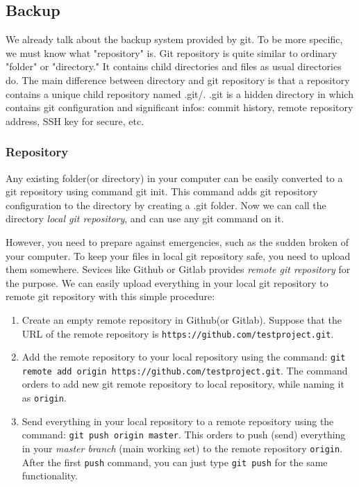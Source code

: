 \documentclass{oblivoir}
\begin{document}
\subsection{Backup}

We already talk about the backup system provided by git. To be more specific, we must know what "repository" is. Git repository is quite similar to ordinary "folder" or "directory."  It contains child directories and files as usual directories do. The main difference between directory and git repository is that a repository contains a unique child repository named .git/. .git is a hidden directory in which contains git configuration and significant infos: commit history, remote repository address, SSH key for secure, etc. 

\subsubsection{Repository}

Any existing folder(or directory) in your computer can be easily converted to a git repository using command git init. This command adds git repository configuration to the directory by creating a .git folder. Now we can call the directory \textit{local git repository}, and can use any git command on it. 

However, you need to prepare against emergencies, such as the sudden broken of your computer. To keep your files in local git repository safe, you need to upload them somewhere. Sevices like Github or Gitlab provides \textit{remote git repository} for the purpose. We can easily upload everything in your local git repository to remote git repository with this simple procedure:

\begin{enumerate}
    \item Create an empty remote repository in Github(or Gitlab). Suppose that the URL of the remote repository is \texttt{https://github.com/testproject.git}.
    \item Add the remote repository to your local repository using the command: \texttt{git remote add origin https://github.com/testproject.git}. The command orders to add new git remote repository to local repository, while naming it as \texttt{origin}.
    \item Send everything in your local repository to a remote repository using the command: \texttt{git push origin master}. This orders to push (send) everything in your \textit{master branch} (main working set) to the remote repository \texttt{origin}. After the first \texttt{push} command, you can just type \texttt{git push} for the same functionality. 
\end{enumerate}
\end{document}
